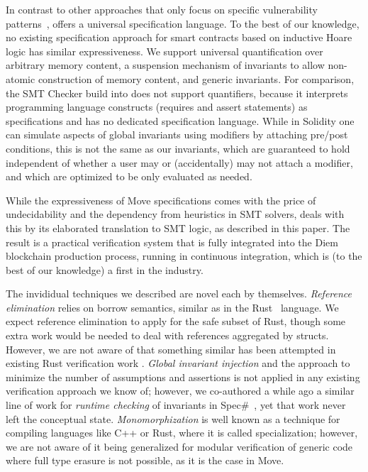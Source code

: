 
In contrast to other approaches that only focus on specific vulnerability
patterns~\cite{mythril,oyente,maian,securify}, \MVP offers a universal
specification language. To the best of our knowledge, no existing specification
approach for smart contracts based on inductive Hoare logic has similar
expressiveness. We support universal quantification over arbitrary memory
content, a suspension mechanism of invariants to allow non-atomic construction
of memory content, and generic invariants.  For comparison, the SMT Checker
build into \solidity \cite{solidity,solcverify,DBLP:conf/esop/HajduJ20}
does not support quantifiers, because it interprets programming language
constructs (requires and assert statements) as specifications and has no
dedicated specification language. While in Solidity one can simulate aspects of
global invariants using modifiers by attaching pre/post conditions, this is not
the same as our invariants, which are guaranteed to hold independent of whether
a user may or (accidentally) may not attach a modifier, and which are optimized
to be only evaluated as needed.

While the expressiveness of Move specifications comes with the price of
undecidability and the dependency from heuristics in SMT solvers, \MVP deals
with this by its elaborated translation to SMT logic, as described in this
paper. The result is a practical verification system that is fully integrated
into the Diem blockchain production process, running in continuous integration,
which is (to the best of our knowledge) a first in the industry.

The invididual techniques we described are novel each by
themselves. \emph{Reference elimination} relies on borrow semantics, similar as
in the Rust~\cite{rust} language.  We expect reference elimination to apply for
the safe subset of Rust, though some extra work would be needed to deal with
references aggregated by structs.  However, we are not aware of that something
similar has been attempted in existing Rust verification work
\cite{prusti,smack,nopanic,crust}. \emph{Global invariant injection} and the
approach to minimize the number of assumptions and assertions is not applied in
any existing verification approach we know of; however, we co-authored a while
ago a similar line of work for \emph{runtime checking} of invariants in
Spec\#~\cite{StateConstraintsPatent}, yet that work never left the conceptual
state. \emph{Monomorphization} is well known as a technique for compiling
languages like C++ or Rust, where it is called specialization; however, we are
not aware of it being generalized for modular verification of generic code where
full type erasure is not possible, as it is the case in Move.


